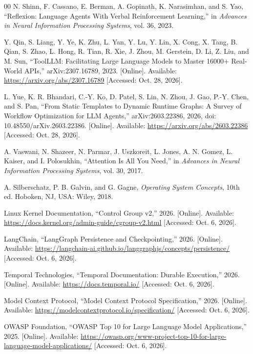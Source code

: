 {\begin{thebibliography}{00}
 N. Shinn, F. Cassano, E. Berman, A. Gopinath, K. Narasimhan, and S. Yao, ``Reflexion: Language Agents With Verbal Reinforcement Learning,'' in \emph{Advances in Neural Information Processing Systems}, vol. 36, 2023.

 Y. Qin, S. Liang, Y. Ye, K. Zhu, L. Yan, Y. Lu, Y. Lin, X. Cong, X. Tang, B. Qian, S. Zhao, L. Hong, R. Tian, R. Xie, J. Zhou, M. Gerstein, D. Li, Z. Liu, and M. Sun, ``ToolLLM: Facilitating Large Language Models to Master 16000+ Real-World APIs,'' arXiv:2307.16789, 2023. [Online]. Available: \url{https://arxiv.org/abs/2307.16789} [Accessed: Oct. 28, 2026].

 L. Yue, K. R. Bhandari, C.-Y. Ko, D. Patel, S. Lin, N. Zhou, J. Gao, P.-Y. Chen, and S. Pan, ``From Static Templates to Dynamic Runtime Graphs: A Survey of Workflow Optimization for LLM Agents,'' arXiv:2603.22386, 2026, doi: 10.48550/arXiv.2603.22386. [Online]. Available: \url{https://arxiv.org/abs/2603.22386} [Accessed: Oct. 28, 2026].

 A. Vaswani, N. Shazeer, N. Parmar, J. Uszkoreit, L. Jones, A. N. Gomez, L. Kaiser, and I. Polosukhin, ``Attention Is All You Need,'' in \emph{Advances in Neural Information Processing Systems}, vol. 30, 2017.

 A. Silberschatz, P. B. Galvin, and G. Gagne, \emph{Operating System Concepts}, 10th ed. Hoboken, NJ, USA: Wiley, 2018.

 Linux Kernel Documentation, ``Control Group v2,'' 2026. [Online]. Available: \url{https://docs.kernel.org/admin-guide/cgroup-v2.html} [Accessed: Oct. 6, 2026].

 LangChain, ``LangGraph Persistence and Checkpointing,'' 2026. [Online]. Available: \url{https://langchain-ai.github.io/langgraphjs/concepts/persistence/} [Accessed: Oct. 6, 2026].

 Temporal Technologies, ``Temporal Documentation: Durable Execution,'' 2026. [Online]. Available: \url{https://docs.temporal.io/} [Accessed: Oct. 6, 2026].

 Model Context Protocol, ``Model Context Protocol Specification,'' 2026. [Online]. Available: \url{https://modelcontextprotocol.io/specification/} [Accessed: Oct. 6, 2026].

 OWASP Foundation, ``OWASP Top 10 for Large Language Model Applications,'' 2025. [Online]. Available: \url{https://owasp.org/www-project-top-10-for-large-language-model-applications/} [Accessed: Oct. 6, 2026].


\end{thebibliography}}
